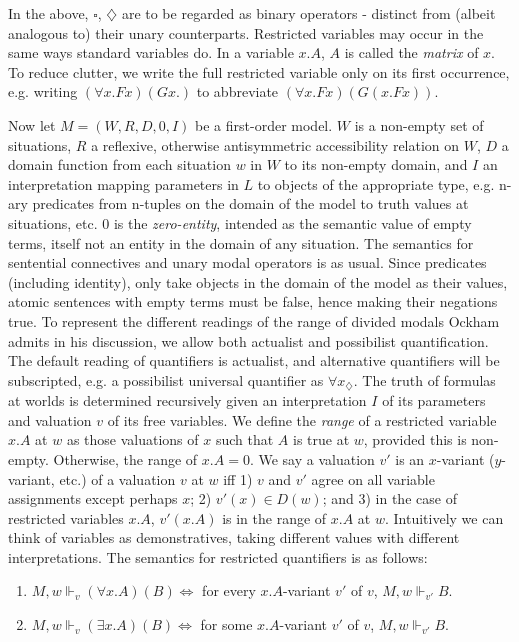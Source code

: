 	In the above, $\square$, $\diamondsuit$ are to be regarded as binary operators  - distinct from (albeit analogous to) their unary counterparts. Restricted variables may occur in the same ways standard variables do. In a variable $x.A$, $A$ is called the \textit{matrix} of $x$. To reduce clutter, we write the full restricted variable only on its first occurrence, e.g. writing $(\forall x.Fx)(Gx.)$ to abbreviate $(\forall x.Fx)(G(x.Fx))$. 
	
	Now let $M = (W, R, D, 0, I)$ be a first-order model. $W$ is a non-empty set of situations, $R$ a reflexive, otherwise antisymmetric accessibility relation on $W$, $D$ a domain function from each situation $w$ in $W$ to its non-empty domain, and $I$ an interpretation mapping parameters in $L$ to objects of the appropriate type, e.g. n-ary predicates from n-tuples on the domain of the model to truth values at situations, etc. $0$ is the \textit{zero-entity}, intended as the semantic value of empty terms, itself not an entity in the domain of any situation. The semantics for sentential connectives and unary modal operators is as usual. Since predicates (including identity), only take objects in the domain of the model as their values, atomic sentences with empty terms must be false, hence making their negations true. To represent the different readings of the range of divided modals Ockham admits in his discussion, we allow both actualist and possibilist quantification. The default reading of quantifiers is actualist, and alternative quantifiers will be subscripted, e.g. a possibilist universal quantifier as $\forall x_{\diamondsuit}$. The truth of formulas at worlds is determined recursively given an interpretation $I$ of its parameters and valuation $v$ of its free variables. We define the \textit{range} of a restricted variable $x.A$ at $w$ as those valuations of $x$ such that $A$ is true at $w$, provided this is non-empty. Otherwise, the range of $x.A = 0$. We say a valuation $v'$ is an $x$-variant ($y$-variant, etc.) of a valuation $v$ at $w$ iff 1) $v$ and $v'$ agree on all variable assignments except perhaps $x$; 2) $v'(x) \in D(w)$; and 3) in the case of restricted variables $x.A$, $v'(x.A)$ is in the range of $x.A$ at $w$. Intuitively we can think of variables as demonstratives, taking different values with different interpretations. The semantics for restricted quantifiers is as follows: 
	\begin{enumerate}
		\item $M, w \Vdash_{v} (\forall x.A)(B) \Leftrightarrow$ for every $x.A$-variant $v'$ of $v$, $M, w \Vdash_{v'} B$.
		\item $M, w \Vdash_{v} (\exists x.A)(B) \Leftrightarrow$ for some $x.A$-variant $v'$ of $v$, $M, w \Vdash_{v'} B$.
	\end{enumerate}
